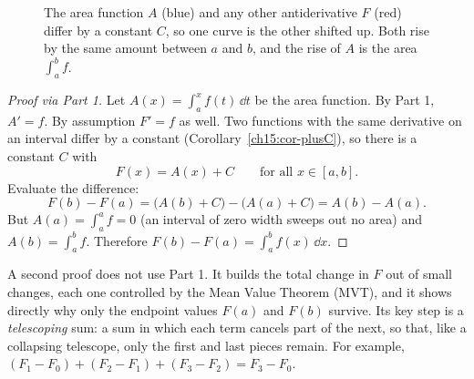 \begin{figure}[htbp]
\centering
{}
\caption{The area function $A$ (blue) and any other antiderivative $F$ (red) differ
by a constant $C$, so one curve is the other shifted up. Both rise by the same
amount between $a$ and $b$, and the rise of $A$ is the area $\int_a^b f$.}
\label{ch21:fig-shift}
\end{figure}

\begin{proof}[Proof via Part 1]
Let $A(x)=\int_a^x f(t)\,\dd t$ be the area function. By Part 1, $A'=f$. By
assumption $F'=f$ as well. Two functions with the same derivative on an interval
differ by a constant (Corollary~\ref{ch15:cor-plusC}), so there is a
constant $C$ with
\[
  F(x) = A(x) + C \qquad\text{for all } x\in[a,b].
\]
Evaluate the difference:
\[
  F(b)-F(a) = \big(A(b)+C\big)-\big(A(a)+C\big) = A(b)-A(a).
\]
But $A(a)=\int_a^a f = 0$ (an interval of zero width sweeps out no area) and
$A(b)=\int_a^b f$. Therefore $F(b)-F(a)=\int_a^b f(x)\,\dd x$.
\end{proof}

A second proof does not use Part 1. It builds the total change in $F$ out of
small changes, each one controlled by the Mean Value Theorem (MVT), and it shows
directly why only the endpoint values $F(a)$ and $F(b)$ survive. Its key step is
a \emph{telescoping} sum: a sum in which each term cancels part of the next, so
that, like a collapsing telescope, only the first and last pieces remain. For
example, $(F_1-F_0)+(F_2-F_1)+(F_3-F_2)=F_3-F_0$.

